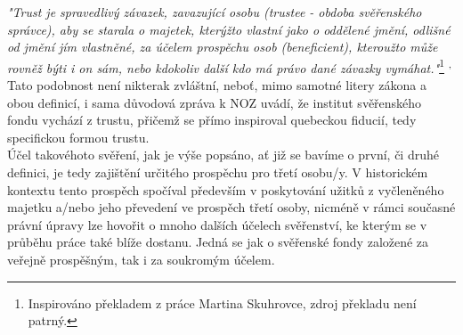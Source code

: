 \documentclass{article}
\begin{document}
\textit{"Trust je spravedlivý závazek, zavazující osobu (trustee - obdoba svěřenského správce), aby se starala o majetek, kterýžto vlastní jako o oddělené jmění, odlišné od jmění jím vlastněné, za účelem prospěchu osob (beneficient), kteroužto může rovněž býti i on sám, nebo kdokoliv další kdo má právo dané závazky vymáhat."}\footnote{Inspirováno překladem z práce Martina Skuhrovce, zdroj překladu není patrný.} \textsuperscript{,}   \\

Tato podobnost není nikterak zvláštní, neboť, mimo samotné litery zákona a obou definicí, i sama důvodová zpráva k NOZ uvádí, že institut svěřenského fondu vychází z trustu, přičemž se přímo inspiroval quebeckou fiducií, tedy specifickou formou trustu.\\


Účel takovéhoto svěření, jak je výše popsáno, ať již se bavíme o první, či druhé definici, je tedy zajištění určitého prospěchu pro třetí osobu/y. V historickém kontextu tento prospěch spočíval především v poskytování užitků z vyčleněného majetku a/nebo jeho převedení ve prospěch třetí osoby, nicméně v rámci současné právní úpravy lze hovořit o mnoho dalších účelech svěřenství, ke kterým se v průběhu práce také blíže dostanu. Jedná se jak o svěřenské fondy založené za veřejně prospěšným, tak i za soukromým účelem.\\
\end{document}
